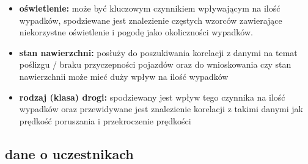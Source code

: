 \begin{itemize}
\itemsep-14pt\parskip0pt
\item
  \textbf{oświetlenie:} może być kluczowym czynnikiem wpływającym na
  ilość wypadków, spodziewane jest znalezienie częstych wzorców
  zawierające niekorzystne oświetlenie i pogodę jako okoliczności
  wypadków.\\
\item
  \textbf{stan nawierzchni:} posłuży do poszukiwania korelacji z danymi
  na temat poślizgu / braku przyczepności pojazdów oraz do wnioskowania
  czy stan nawierzchnii może mieć duży wpływ na ilość wypadków\\
\item
  \textbf{rodzaj (klasa) drogi:} spodziewany jest wpływ tego czynnika na
  ilość wypadków oraz przewidywane jest znalezienie korelacji z takimi
  danymi jak prędkość poruszania i przekroczenie prędkości
\end{itemize}

\subsection{dane o uczestnikach}\label{dane-o-uczestnikach}

